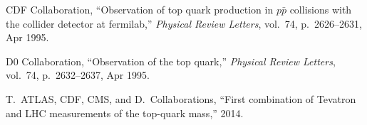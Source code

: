 \documentclass[12pt]{article}
\begin{document}








\begin{thebibliography}{99}



CDF Collaboration, ``Observation
  of top quark production in $p\bar{p}$ collisions with the collider detector at
  fermilab,'' {\em Physical Review Letters}, vol.~74, p.~2626–2631, Apr 1995.

D0 Collaboration, ``Observation of the top
  quark,'' {\em Physical Review Letters}, vol.~74, p.~2632–2637, Apr 1995.

T.~ATLAS, CDF, CMS, and D.~Collaborations, ``First combination of Tevatron and
  LHC measurements of the top-quark mass,'' 2014.


\end{thebibliography}

 
\end{document}
